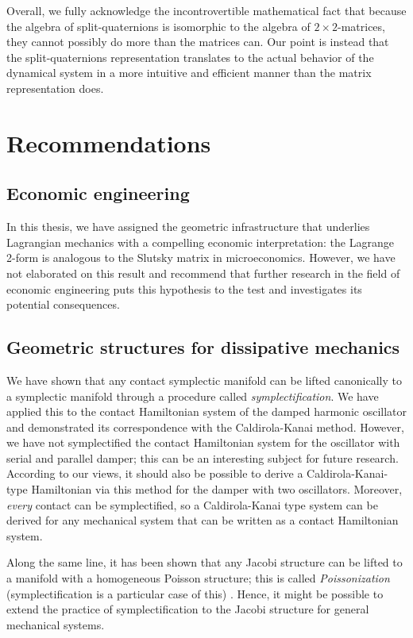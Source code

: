 Overall, we fully acknowledge the incontrovertible mathematical fact that because the algebra of split-quaternions is isomorphic to the algebra of $2\times2$-matrices, they cannot possibly do more than the matrices can. Our point is instead that the split-quaternions representation translates to the actual behavior of the dynamical system in a more intuitive and efficient manner than the matrix representation does.

\clearpage
\section*{Recommendations}

\subsection*{Economic engineering}
In this thesis, we have assigned the geometric infrastructure that underlies Lagrangian mechanics with a compelling economic interpretation: the Lagrange 2-form is analogous to the Slutsky matrix in microeconomics. However, we have not elaborated on this result and recommend that further research in the field of economic engineering puts this hypothesis to the test and investigates its potential consequences.

\subsection*{Geometric structures for dissipative mechanics}
We have shown that any contact symplectic manifold can be lifted canonically to a symplectic manifold through a procedure called \emph{symplectification}. We have applied this to the contact Hamiltonian system of the damped harmonic oscillator and demonstrated its correspondence with the Caldirola-Kanai method. However, we have not symplectified the contact Hamiltonian system for the oscillator with serial and parallel damper; this can be an interesting subject for future research. According to our views, it should also be possible to derive a Caldirola-Kanai-type Hamiltonian via this method for the damper with two oscillators. Moreover, \emph{every} contact can be symplectified, so a Caldirola-Kanai type system can be derived for any mechanical system that can be written as a contact Hamiltonian system.

Along the same line, it has been shown that any Jacobi structure can be lifted to a manifold with a homogeneous Poisson structure; this is called \emph{Poissonization} (symplectification is a particular case of this) \cite{marle1991}. Hence, it might be possible to extend the practice of symplectification to the Jacobi structure for general mechanical systems. 

